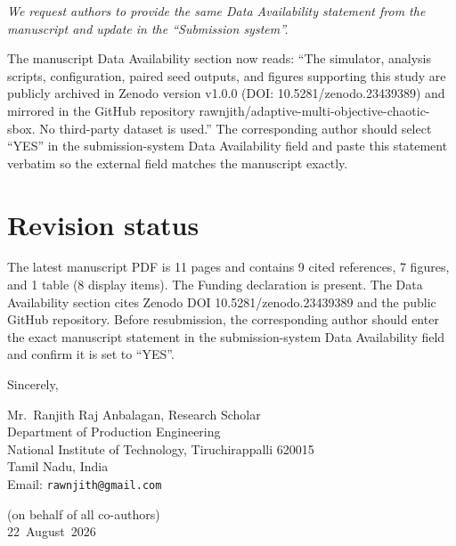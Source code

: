 \documentclass[11pt,a4paper]{article}
\begin{document}
\begin{tcolorbox}[colback=yellow!5!white,colframe=black!50!white,title=\textbf{Editor Comment}]
\textit{We request authors to provide the same Data Availability statement from the manuscript and update in the ``Submission system''.}
\end{tcolorbox}

\begin{tcolorbox}[colback=green!5!white,colframe=black!50!white,title=\textbf{Our Response}]
The manuscript Data Availability section now reads: ``The simulator, analysis scripts, configuration, paired seed outputs, and figures supporting this study are publicly archived in Zenodo version v1.0.0 (DOI: 10.5281/zenodo.23439389) and mirrored in the GitHub repository rawnjith/adaptive-multi-objective-chaotic-sbox. No third-party dataset is used.'' The corresponding author should select ``YES'' in the submission-system Data Availability field and paste this statement verbatim so the external field matches the manuscript exactly.
\end{tcolorbox}

\label{sec:dataavail}

\section*{Revision status}

The latest manuscript PDF is 11 pages and contains 9 cited references, 7 figures, and 1 table (8 display items). The Funding declaration is present. The Data Availability section cites Zenodo DOI 10.5281/zenodo.23439389 and the public GitHub repository. Before resubmission, the corresponding author should enter the exact manuscript statement in the submission-system Data Availability field and confirm it is set to ``YES''.

\vspace{1cm}

\noindent Sincerely,

\vspace{0.3cm}

\noindent Mr.~Ranjith Raj Anbalagan, Research Scholar\\
Department of Production Engineering\\
National Institute of Technology, Tiruchirappalli 620015\\
Tamil Nadu, India\\
Email: \texttt{rawnjith@gmail.com}

\vspace{0.3cm}

\noindent (on behalf of all co-authors)\\
22~August~2026
\end{document}
